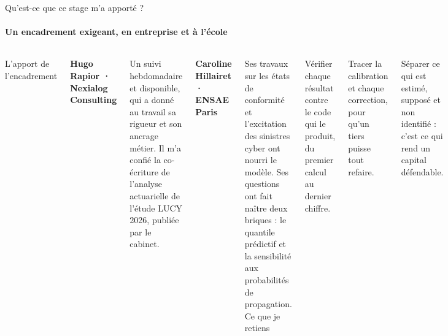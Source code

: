 \documentclass[aspectratio=169,10pt,t]{beamer}
\begin{document}
\begin{frame}{Qu'est-ce que ce stage m'a apporté ?}
  \suivimethode{}{}
  \framesubtitle{Un encadrement exigeant, en entreprise et à l'école}
  \begin{columns}[T]
    {\editorial\normalsize L'apport de l'encadrement}\par\vspace{3mm}
    \small\textbf{Hugo Rapior · Nexialog Consulting}\par\vspace{1mm}
    Un suivi hebdomadaire et disponible, qui a donné au travail sa rigueur et son ancrage métier.
    Il m'a confié la co-écriture de l'analyse actuarielle de l'étude LUCY 2026, publiée par le cabinet.\par\vspace{3mm}
    \textbf{Caroline Hillairet · ENSAE Paris}\par\vspace{1mm}
    Ses travaux sur les états de conformité et l'excitation des sinistres cyber ont nourri le modèle.
    Ses questions ont fait naître deux briques : le quantile prédictif et la sensibilité aux probabilités de propagation.
    {\editorial\normalsize Ce que je retiens}\par\vspace{3mm}
    \small Vérifier chaque résultat contre le code qui le produit, du premier calcul au dernier chiffre.\par\vspace{3mm}
    Tracer la calibration et chaque correction, pour qu'un tiers puisse tout refaire.\par\vspace{3mm}
    Séparer ce qui est estimé, supposé et non identifié : c'est ce qui rend un capital défendable.
  \end{columns}
\end{frame}
\end{document}
